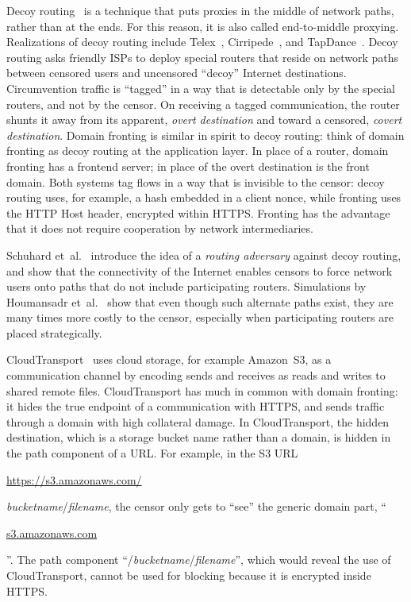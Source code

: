 \documentclass{sig-alternate}
\def\urll#1{\begin{NoHyper}\url{#1}\end{NoHyper}}
\begin{document}
Decoy routing~\cite{decoyrouting}
is a technique that puts
proxies in the middle of network paths, rather than at the ends.
For this reason, it is also called end-to-middle proxying.
Realizations of decoy routing include Telex~\cite{telex},
Cirripede~\cite{cirripede}, and TapDance~\cite{tapdance}.
Decoy routing asks friendly ISPs to deploy special routers that reside
on network paths between censored users and uncensored ``decoy'' Internet destinations.
Circumvention traffic is ``tagged'' in a way that is detectable only
by the special routers, and not by the censor.
On receiving a tagged communication, the router shunts it away from its apparent, \emph{overt destination}
and toward a censored, \emph{covert destination}.
Domain fronting is similar in spirit to decoy routing:
think of domain fronting as decoy routing at the application layer.
In place of a router, domain fronting has a frontend server;
in place of the overt destination is the front domain.
Both systems tag flows in a way that is invisible to the censor:
decoy routing uses, for example, a hash embedded in a client nonce,
while fronting uses the HTTP Host header, encrypted within HTTPS.
Fronting has the advantage that it does not require cooperation by network intermediaries.

Schuhard et~al.~\cite{ccs2012-decoys}
introduce the idea of a \emph{routing adversary} against decoy routing,
and show that the connectivity of the Internet enables
censors to force network users onto paths that do not include participating routers.
Simulations by Houmansadr et~al.~\cite{nodirectionhome}
show that even though such alternate paths exist,
they are many times more costly to the censor,
especially when participating routers are placed strategically.

CloudTransport~\cite{cloudtransport} uses cloud storage, for example Amazon~S3,
as a communication channel by encoding sends and receives as reads and writes to shared remote files.
CloudTransport has much in common with domain fronting:
it hides the true endpoint of a communication with HTTPS,
and sends traffic through a domain with high collateral damage.
In CloudTransport, the hidden destination, which is a storage bucket name rather than a domain,
is hidden in the path component of a URL.
For example, in the S3 URL
\urll{https://s3.amazonaws.com/}\textsl{bucketname}/\textsl{filename},
the censor only gets to ``see'' the generic domain part, ``\urll{s3.amazonaws.com}''.
The path component ``/\textsl{bucketname}/\textsl{filename}'',
which would reveal the use of CloudTransport,
cannot be used for blocking because it is encrypted inside HTTPS.
\end{document}
